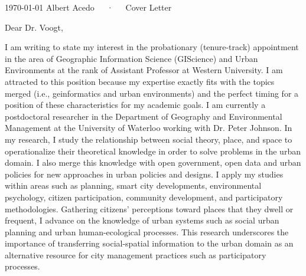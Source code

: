 \documentclass[11pt, a4paper]{awesome-cv}
\begin{document}
\makecvheader[R]

\makecvfooter
  {\today}
    {Albert Acedo~~~·~~~Cover Letter}
  {}

\makelettertitle

\begin{cvletter}
Dear Dr. Voogt,

I am writing to state my interest in the probationary (tenure-track) appointment in the area of Geographic Information Science (GIScience) and Urban Environments at the rank of Assistant Professor at Western University. I am attracted to this position because my expertise exactly fits with the topics merged (i.e., geinformatics and urban environments) and the perfect timing for a position of these characteristics for my academic goals. I am currently a postdoctoral researcher in the Department of Geography and Environmental Management at the University of Waterloo working with Dr. Peter Johnson. In my research, I study the relationship between social theory, place, and space to operationalize their theoretical knowledge in order to solve problems in the urban domain. I also merge this knowledge with open government, open data and urban policies for new approaches in urban policies and designs. I apply my studies within areas such as planning, smart city developments, environmental psychology, citizen participation, community development, and participatory methodologies. Gathering citizens’ perceptions toward places that they dwell or frequent, I advance on the knowledge of urban systems such as social urban planning and urban human-ecological processes. This research underscores the importance of transferring social-spatial information to the urban domain as an alternative resource for city management practices such as participatory processes.\par



\end{cvletter}
\end{document}
